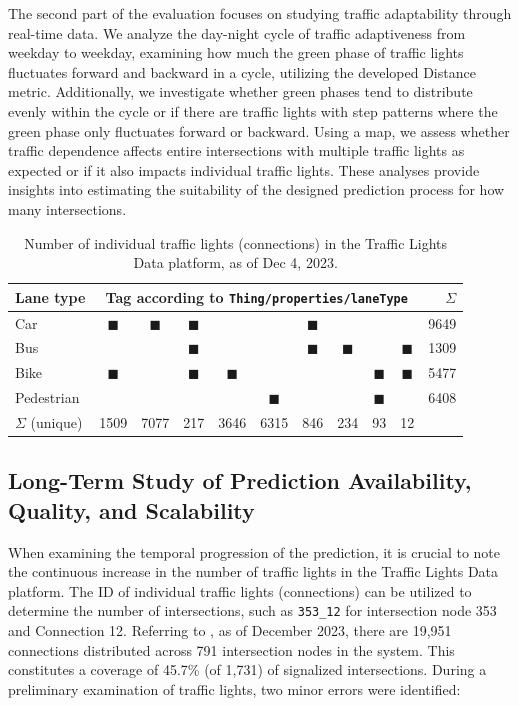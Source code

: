 The second part of the evaluation focuses on studying traffic adaptability through real-time data. We analyze the day-night cycle of traffic adaptiveness from weekday to weekday, examining how much the green phase of traffic lights fluctuates forward and backward in a cycle, utilizing the developed Distance metric. Additionally, we investigate whether green phases tend to distribute evenly within the cycle or if there are traffic lights with step patterns where the green phase only fluctuates forward or backward. Using a map, we assess whether traffic dependence affects entire intersections with multiple traffic lights as expected or if it also impacts individual traffic lights. These analyses provide insights into estimating the suitability of the designed prediction process for how many intersections.


\begin{table}[b]
    \centering
    \begin{tabular}{@{}l|ccccccccc|r@{}}
        \hline
        \textbf{Lane type} & \multicolumn{9}{c|}{\textbf{Tag according to \texttt{Thing/properties/laneType}}} & $\Sigma$ \\
        \hline
        Car        & $\blacksquare$ & $\blacksquare$ & $\blacksquare$ &   &   & $\blacksquare$ &   &   &   &  9649 \\
        Bus        &   &   & $\blacksquare$ &   &   & $\blacksquare$ & $\blacksquare$ &   & $\blacksquare$ &  1309 \\
        Bike     & $\blacksquare$ &   & $\blacksquare$ & $\blacksquare$ &   &   &   & $\blacksquare$ & $\blacksquare$ &  5477 \\
        Pedestrian &   &   &   &   & $\blacksquare$ &   &   & $\blacksquare$ &   &  6408 \\
        \hline
        $\Sigma$ (unique) & 1509 & 7077 & 217 & 3646 & 6315 & 846 & 234 & 93 & 12 & \\
        \hline
    \end{tabular}
    \caption{Number of individual traffic lights (connections) in the Traffic Lights Data platform, as of Dec 4, 2023.}
    \label{tab:tld-number-of-things}
\end{table}


\subsection{Long-Term Study of Prediction Availability, Quality, and Scalability}

When examining the temporal progression of the prediction, it is crucial to note the continuous increase in the number of traffic lights in the Traffic Lights Data platform. The ID of individual traffic lights (connections) can be utilized to determine the number of intersections, such as \texttt{353\_12} for intersection node 353 and Connection 12. Referring to , as of December 2023, there are 19,951 connections distributed across 791 intersection nodes in the system. This constitutes a coverage of 45.7\% (of 1,731) of signalized intersections. During a preliminary examination of traffic lights, two minor errors were identified:


